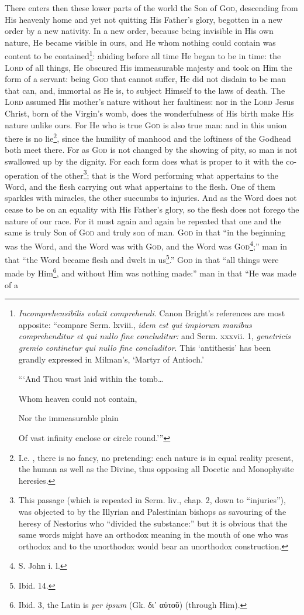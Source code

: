 There enters then these lower parts of the world the Son of \textsc{God}, descending from His heavenly home and yet not quitting His Father’s glory, begotten in a new order by a new nativity. In a new order, because being invisible in His own nature, He became visible in ours, and He whom nothing could contain was content to be contained\footnote{\emph{Incomprehensibilis voluit comprehendi}. Canon Bright’s references are most apposite: “compare Serm. lxviii., \emph{idem est qui impiorum manibus comprehenditur et qui nullo fine concluditur:} and Serm. xxxvii. 1, \emph{genetricis gremio continetur qui nullo fine concluditor}. This ‘antithesis’ has been grandly expressed in Milman’s, ‘Martyr of Antioch.’ \par “‘And Thou wast laid within the tomb… \par Whom heaven could not contain, \par Nor the immeasurable plain \par Of vast infinity enclose or circle round.’”}: abiding before all time He began to be in time: the \textsc{Lord} of all things, He obscured His immeasurable majesty and took on Him the form of a servant: being \textsc{God} that cannot suffer, He did not disdain to be man that can, and, immortal as He is, to subject Himself to the laws of death. The \textsc{Lord} assumed His mother’s nature without her faultiness: nor in the \textsc{Lord} Jesus Christ, born of the Virgin’s womb, does the wonderfulness of His birth make His nature unlike ours. For He who is true \textsc{God} is also true man: and in this union there is no lie\footnote{I.e. , there is no fancy, no pretending: each nature is in equal reality present, the human as well as the Divine, thus opposing all Docetic and Monophysite heresies.}, since the humility of manhood and the loftiness of the Godhead both meet there. For as \textsc{God} is not changed by the showing of pity, so man is not swallowed up by the dignity. For each form does what is proper to it with the co-operation of the other\footnote{This passage (which is repeated in Serm. liv., chap. 2, down to “injuries”), was objected to by the Illyrian and Palestinian bishops as savouring of the heresy of Nestorius who “divided the substance:” but it is obvious that the same words might have an orthodox meaning in the mouth of one who was orthodox and to the unorthodox would bear an unorthodox construction.}; that is the Word performing what appertains to the Word, and the flesh carrying out what appertains to the flesh. One of them sparkles with miracles, the other succumbs to injuries. And as the Word does not cease to be on an equality with His Father’s glory, so the flesh does not forego the nature of our race. For it must again and again be repeated that one and the same is truly Son of \textsc{God} and truly son of man. \textsc{God} in that “in the beginning was the Word, and the Word was with \textsc{God}, and the Word was \textsc{God\footnote{S. John i. l.}};” man in that “the Word became flesh and dwelt in us\footnote{Ibid. 14.}.” \textsc{God} in that “all things were made by Him\footnote{Ibid. 3, the Latin is \emph{per ipsum} (Gk. \textgreek{δι᾽ αὐτοῦ}) (through Him).}, and without Him was nothing made:” man in that “He was made of a 